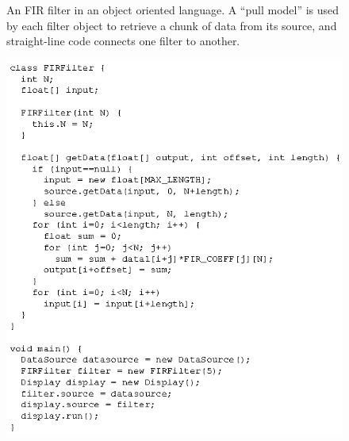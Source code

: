 \documentclass[final]{ijpp}
\begin{document}
\clearpage
\begin{figure}
  \caption{An FIR filter in an object oriented language.  A ``pull
  model'' is used by each filter object to retrieve a chunk of data
  from its source, and straight-line code connects one filter to
  another.}
  \label{fig:firobject}
\end{figure}
\clearpage
\begin{figure}
  \includegraphics{fir-object.eps}
\end{figure}
\end{document}
